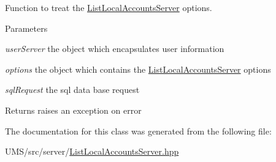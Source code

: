 Function to treat the \hyperlink{classListLocalAccountsServer}{ListLocalAccountsServer} options. 


\begin{DoxyParams}{Parameters}
\item[{\em userServer}]the object which encapsulates user information \item[{\em options}]the object which contains the \hyperlink{classListLocalAccountsServer}{ListLocalAccountsServer} options \item[{\em sqlRequest}]the sql data base request \end{DoxyParams}
\begin{DoxyReturn}{Returns}
raises an exception on error 
\end{DoxyReturn}


The documentation for this class was generated from the following file:\begin{DoxyCompactItemize}
\item 
UMS/src/server/\hyperlink{ListLocalAccountsServer_8hpp}{ListLocalAccountsServer.hpp}\end{DoxyCompactItemize}
